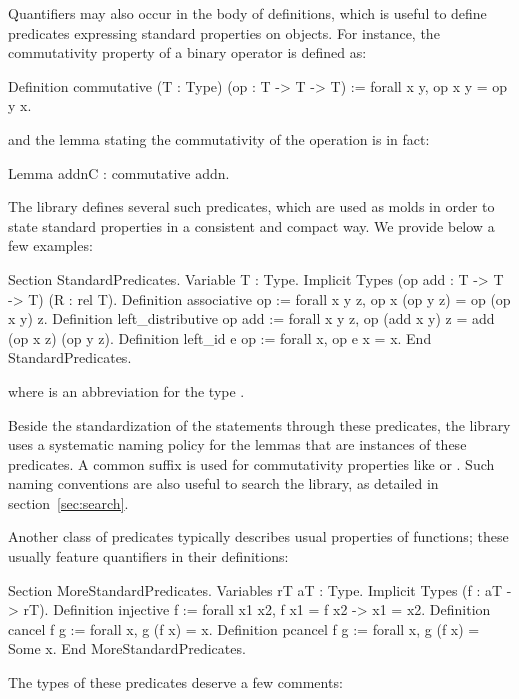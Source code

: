 Quantifiers may also occur in the body of definitions, which is
useful to define predicates expressing standard properties on
objects. For instance, the commutativity property of a binary operator
is defined as:

\begin{coq}{}{}
Definition commutative (T : Type) (op : T -> T -> T) :=
  forall x y, op x y = op y x.
\end{coq}
and the lemma stating the commutativity of the  operation is
in fact:

\begin{coq}{}{}
Lemma addnC : commutative addn.
\end{coq}
The \mcbMC{} library defines several such predicates, which are used
as molds in order to state standard properties in a consistent and
compact way. We provide below a few examples:

\begin{coq}{}{}
Section StandardPredicates.
Variable T : Type.
Implicit Types (op add : T -> T -> T) (R : rel T).
Definition associative op := forall x y z, op x (op y z) = op (op x y) z.
Definition left_distributive op add :=
  forall x y z, op (add x y) z = add (op x z) (op y z).
Definition left_id e op := forall x, op e x = x.
End StandardPredicates.
\end{coq}
where  is an abbreviation for the type .

Beside the standardization of the statements through these
predicates, the \mcbMC{} library uses a systematic naming policy for the lemmas
that are instances of these predicates. A common suffix  is
used for commutativity properties like  or .
Such naming conventions are also useful to search the library, as detailed
in section~\ref{sec:search}.

Another class of predicates typically
describes usual properties of functions; these usually feature
quantifiers in their definitions:

\begin{coq}{}{}
Section MoreStandardPredicates.
Variables rT aT : Type.
Implicit Types (f : aT -> rT).
Definition injective f := forall x1 x2, f x1 = f x2 -> x1 = x2.
Definition cancel f g := forall x, g (f x) = x.
Definition pcancel f g := forall x, g (f x) = Some x.
End MoreStandardPredicates.
\end{coq}
The types of these predicates deserve a few comments:

